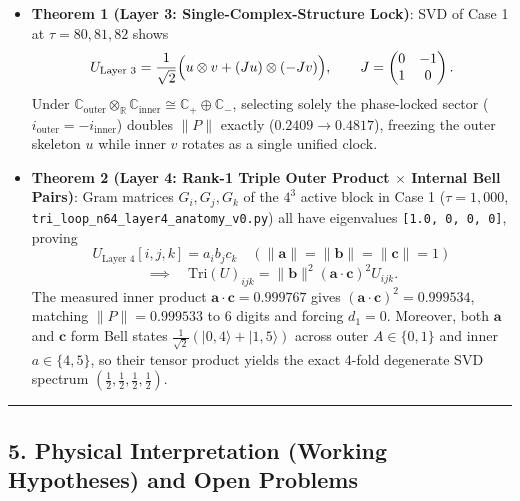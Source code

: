 \documentclass[
  a4paper,
]{article}
\providecommand{\tightlist}{%
  \setlength{\itemsep}{0pt}\setlength{\parskip}{0pt}}
\begin{document}
\begin{itemize}
\tightlist
\item
  \textbf{Theorem 1 (Layer 3: Single-Complex-Structure Lock)}: SVD of
  Case 1 at \(\tau = 80, 81, 82\) shows
  \[U_{\text{Layer 3}} = \frac{1}{\sqrt{2}}\Bigl( u \otimes v + (J u) \otimes (-J v) \Bigr), \qquad J = \begin{pmatrix} 0 & -1 \\ 1 & 0 \end{pmatrix}.\]
  Under
  \(\mathbb{C}_{\mathrm{outer}} \otimes_{\mathbb{R}} \mathbb{C}_{\mathrm{inner}} \cong \mathbb{C}_{+} \oplus \mathbb{C}_{-}\),
  selecting solely the phase-locked sector
  (\(i_{\mathrm{outer}} = -i_{\mathrm{inner}}\)) doubles \(\|P\|\)
  exactly (\(0.2409 \to 0.4817\)), freezing the outer skeleton \(u\)
  while inner \(v\) rotates as a single unified clock.
\item
  \textbf{Theorem 2 (Layer 4: Rank-1 Triple Outer Product \(\times\)
  Internal Bell Pairs)}: Gram matrices \(G_i, G_j, G_k\) of the \(4^3\)
  active block in Case 1 (\(\tau = 1,000\),
  \texttt{tri\_\allowbreak{}loop\_\allowbreak{}n64\_\allowbreak{}layer4\_\allowbreak{}anatomy\_\allowbreak{}v0.py}) all have eigenvalues
  \texttt{{[}1.0,\ 0,\ 0,\ 0{]}}, proving
  \[U_{\text{Layer 4}}[i, j, k] = a_i b_j c_k \quad (\|\mathbf{a}\|=\|\mathbf{b}\|=\|\mathbf{c}\|=1)\]
  \[\implies \quad \mathrm{Tri}(U)_{ijk} = \|\mathbf{b}\|^2(\mathbf{a}\cdot\mathbf{c})^2 U_{ijk}.\]
  The measured inner product \(\mathbf{a}\cdot\mathbf{c} = 0.999767\)
  gives \((\mathbf{a}\cdot\mathbf{c})^2 = 0.999534\), matching
  \(\|P\| = 0.999533\) to 6 digits and forcing \(d_1 = 0\). Moreover,
  both \(\mathbf{a}\) and \(\mathbf{c}\) form Bell states
  \(\frac{1}{\sqrt{2}}(|0,4\rangle + |1,5\rangle)\) across outer
  \(A\in\{0,1\}\) and inner \(a\in\{4,5\}\), so their tensor product
  yields the exact 4-fold degenerate SVD spectrum
  \(\left(\frac{1}{2}, \frac{1}{2}, \frac{1}{2}, \frac{1}{2}\right)\).
\end{itemize}

\begin{center}\rule{0.5\linewidth}{0.5pt}\end{center}

\subsection{5. Physical Interpretation (Working Hypotheses) and Open
Problems}\label{physical-interpretation-working-hypotheses-and-open-problems}
\end{document}
